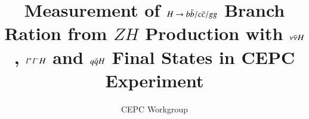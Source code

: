 \documentclass[coverpage]{cepcnote}
\title{Measurement of $H\rightarrow b\bar{b} /c\bar{c} /gg$ Branch Ration from $ZH$ Production with  $\nu \bar{\nu} H$, $l^{+}l^{-}H$ and $q\bar{q}H$  Final States in CEPC Experiment}
\author{CEPC Workgroup}
\begin{document}
\tableofcontents
\clearpage









\clearpage
\pagebreak
\newpage

%



\end{document}
